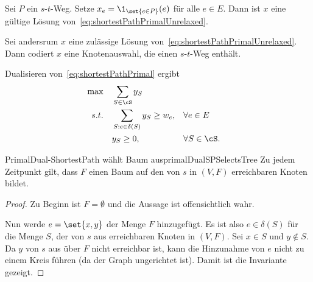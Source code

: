 \documentclass[language=ngerman,algolist]{TemplateLecture}
\begin{document}

Sei $P$ ein $s$-$t$-Weg. Setze $x_e = \1_{\set{e \in P}}(e)$ für alle $e \in E$. Dann ist $x$ eine gültige Lösung von~\eqref{eq:shortestPathPrimalUnrelaxed}. 

Sei andersrum $x$ eine zulässige Lösung von~\eqref{eq:shortestPathPrimalUnrelaxed}. Dann codiert $x$ eine Knotenauswahl, die einen $s$-$t$-Weg enthält.

Dualisieren von~\eqref{eq:shortestPathPrimal} ergibt 
\begin{equation}
    \begin{aligned}
        \max \quad & \sum_{S \in \cS} y_S \\
        s.t. \quad & \sum_{S: e \in \delta(S)} y_S \geq w_e, && \forall e \in E \\
        & y_S \geq 0, && \forall S \in \cS.
    \end{aligned}\label{eq:shortestPathDual}
\end{equation}

\begin{algorithm}[h]
    \caption{\textsc{PrimalDual-ShortestPath}}\label{alg:primalDualShortestPath}
    \begin{algorithmic}[1]
         
        \EndWhile{}
    \end{algorithmic}    
\end{algorithm}

\begin{lem}{PrimalDual-ShortestPath wählt Baum aus}{primalDualSPSelectsTree}
    Zu jedem Zeitpunkt gilt, dass $F$ einen Baum auf den von $s$ in $(V, F)$ erreichbaren Knoten bildet.
\end{lem}

\begin{proof}
    Zu Beginn ist $F = \emptyset$ und die Aussage ist offensichtlich wahr.

    Nun werde $e = \set{x,y}$ der Menge $F$ hinzugefügt. Es ist also $e \in \delta(S)$ für die Menge $S$, der von $s$ aus erreichbaren Knoten in $(V, F)$. Sei $x \in S$ und $y \notin S$. Da $y$ von $s$ aus über $F$ nicht erreichbar ist, kann die Hinzunahme von $e$ nicht zu einem Kreis führen (da der Graph ungerichtet ist). Damit ist die Invariante gezeigt.
\end{proof}
\end{document}

